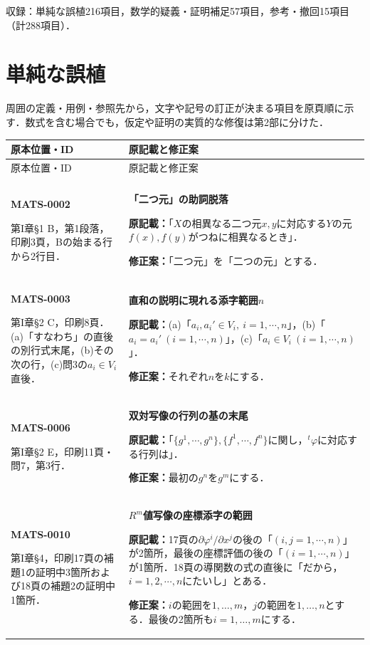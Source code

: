\documentclass[a4paper,10pt]{ltjsarticle}
\begin{document}
\noindent 収録：単純な誤植216項目，数学的疑義・証明補足57項目，参考・撤回15項目（計288項目）．
\clearpage\section{単純な誤植}\label{part:typos}
周囲の定義・用例・参照先から，文字や記号の訂正が決まる項目を原頁順に示す．数式を含む場合でも，仮定や証明の実質的な修復は第2部に分けた．
\small
\begin{longtable}{@{}>{\raggedright\arraybackslash}p{.19\linewidth}>{\raggedright\arraybackslash}p{.77\linewidth}@{}}
\toprule 原本位置・ID & 原記載と修正案\\\midrule\endfirsthead
\toprule 原本位置・ID & 原記載と修正案\\\midrule\endhead
\midrule\multicolumn{2}{r}{次頁へ続く}\\\endfoot
\bottomrule\endlastfoot
\hypertarget{MATS-0002}{}\textbf{MATS-0002}\par 第I章\S1 B，第1段落，印刷3頁，Bの始まる行から2行目． & \textbf{「二つ元」の助詞脱落}\par\textbf{原記載：}「$X$の相異なる二つ元$x,y$に対応する$Y$の元$f(x),f(y)$がつねに相異なるとき」．\par\textbf{修正案：}「二つ元」を「二つの元」とする． \\[3pt]
\hline
\hypertarget{MATS-0003}{}\textbf{MATS-0003}\par 第I章\S2 C，印刷8頁．(a)「すなわち」の直後の別行式末尾，(b)その次の行，(c)問3の$a_i\in V_i$直後． & \textbf{直和の説明に現れる添字範囲$n$}\par\textbf{原記載：}(a)「$a_i,a_i'\in V_i,\ i=1,\cdots,n$」，(b)「$a_i=a_i'\ (i=1,\cdots,n)$」，(c)「$a_i\in V_i\ (i=1,\cdots,n)$」．\par\textbf{修正案：}それぞれ$n$を$k$にする． \\[3pt]
\hline
\hypertarget{MATS-0006}{}\textbf{MATS-0006}\par 第I章\S2 E，印刷11頁・問7，第3行． & \textbf{双対写像の行列の基の末尾}\par\textbf{原記載：}「$\{g^1,\cdots,g^n\},\{f^1,\cdots,f^n\}$に関し，${}^t\varphi$に対応する行列は」．\par\textbf{修正案：}最初の$g^n$を$g^m$にする． \\[3pt]
\hline
\hypertarget{MATS-0010}{}\textbf{MATS-0010}\par 第I章\S4，印刷17頁の補題1の証明中3箇所および18頁の補題2の証明中1箇所． & \textbf{$R^m$値写像の座標添字の範囲}\par\textbf{原記載：}17頁の$\partial\varphi^i/\partial x^j$の後の「$(i,j=1,\cdots,n)$」が2箇所，最後の座標評価の後の「$(i=1,\cdots,n)$」が1箇所．18頁の導関数の式の直後に「だから，$i=1,2,\cdots,n$にたいし」とある．\par\textbf{修正案：}$i$の範囲を$1,\ldots,m$，$j$の範囲を$1,\ldots,n$とする．最後の2箇所も$i=1,\ldots,m$にする． \\[3pt]

\end{longtable}
\end{document}

